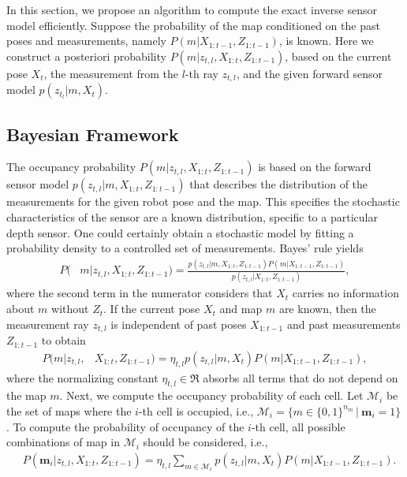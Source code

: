 In this section, we propose an algorithm to compute the exact inverse sensor model efficiently. 
Suppose the probability of the map conditioned on the past poses and measurements, namely $P(m|X_{1:t-1},Z_{1:t-1})$, is known. Here we construct a posteriori probability $P(m|z_{t,l},X_{1:t},Z_{1:t-1})$, based on the current pose $X_t$, the measurement from the $l$-th ray $z_{t,l}$, and the given forward sensor model $p(z_{t_l}|m,X_t)$.



\subsection{Bayesian Framework}

The occupancy probability $P(m|z_{t,l},X_{1:t},Z_{1:t-1})$ is based on the forward sensor model $p(z_{t,l}|m,X_{1:t},Z_{1:t-1})$ that describes the distribution of the measurements for the given robot pose and the map. This specifies the stochastic characteristics of the sensor are a known distribution, specific to a particular depth sensor. One could certainly obtain a stochastic model by fitting a probability density to a controlled set of measurements. Bayes' rule yields
\begin{align}
\label{eqn:BayesRuleRayISM}
P(&m|z_{t,l},X_{1:t},Z_{1:t-1})%
=\frac{p(z_{t,l}|m,X_{1:t},Z_{1:t-1})P(m|X_{1:t-1},Z_{1:t-1})}{p(z_{t,l}|X_{1:t},Z_{1:t-1})},
\end{align}
where the second term in the numerator considers that $X_t$ carries no information about $m$ without $Z_t$.
If the current pose $X_t$ and map $m$ are known, then the measurement ray $z_{t,l}$ is independent of past poses $X_{1:t-1}$ and past measurements $Z_{1:t-1}$ to obtain
\begin{align}
P(m|z_{t,l},&X_{1:t},Z_{1:t-1})%
=\eta_{t,l}p(z_{t,l}|m,X_{t})P(m|X_{1:t-1},Z_{1:t-1}),
\end{align}
where the normalizing constant $\eta_{t,l}\in\Re$ absorbs all terms that do not depend on the map $m$.
Next, we compute the occupancy probability of each cell. Let $\mathcal{M}_i$ be the set of maps where the $i$-th cell is occupied, i.e., $\mathcal{M}_i =\{m\in\{0,1\}^{{n_m}}\,|\ \mathbf{m}_i=1\}$. To compute the probability of occupancy of the $i$-th cell, all possible combinations of map in $\mathcal{M}_i$ should be considered, i.e., 
\begin{align}
\label{eqn:InvSenModWithProbDens}
&P(\mathbf{m}_i|z_{t,l},X_{1:t},Z_{1:t-1})%
=\eta_{t,l}\sum_{m\in\mathcal{M}_i}p(z_{t,l}|m,X_{t})P(m|X_{1:t-1},Z_{1:t-1}).
\end{align}
